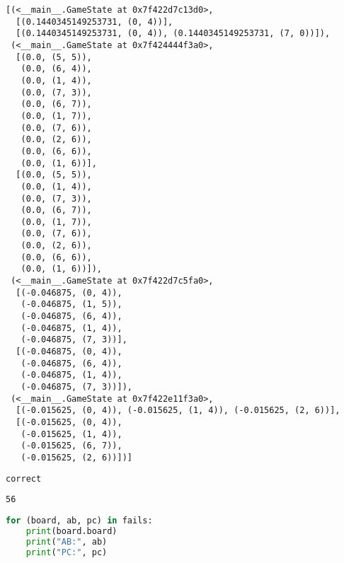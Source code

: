\begin{lstlisting}
[(<__main__.GameState at 0x7f422d7c13d0>,
  [(0.1440345149253731, (0, 4))],
  [(0.1440345149253731, (0, 4)), (0.1440345149253731, (7, 0))]),
 (<__main__.GameState at 0x7f424444f3a0>,
  [(0.0, (5, 5)),
   (0.0, (6, 4)),
   (0.0, (1, 4)),
   (0.0, (7, 3)),
   (0.0, (6, 7)),
   (0.0, (1, 7)),
   (0.0, (7, 6)),
   (0.0, (2, 6)),
   (0.0, (6, 6)),
   (0.0, (1, 6))],
  [(0.0, (5, 5)),
   (0.0, (1, 4)),
   (0.0, (7, 3)),
   (0.0, (6, 7)),
   (0.0, (1, 7)),
   (0.0, (7, 6)),
   (0.0, (2, 6)),
   (0.0, (6, 6)),
   (0.0, (1, 6))]),
 (<__main__.GameState at 0x7f422d7c5fa0>,
  [(-0.046875, (0, 4)),
   (-0.046875, (1, 5)),
   (-0.046875, (6, 4)),
   (-0.046875, (1, 4)),
   (-0.046875, (7, 3))],
  [(-0.046875, (0, 4)),
   (-0.046875, (6, 4)),
   (-0.046875, (1, 4)),
   (-0.046875, (7, 3))]),
 (<__main__.GameState at 0x7f422e11f3a0>,
  [(-0.015625, (0, 4)), (-0.015625, (1, 4)), (-0.015625, (2, 6))],
  [(-0.015625, (0, 4)),
   (-0.015625, (1, 4)),
   (-0.015625, (6, 7)),
   (-0.015625, (2, 6))])]
\end{lstlisting}

\begin{lstlisting}[language=Python]
correct
\end{lstlisting}

\begin{lstlisting}
56
\end{lstlisting}

\begin{lstlisting}[language=Python]
for (board, ab, pc) in fails:
    print(board.board)
    print("AB:", ab)
    print("PC:", pc)
\end{lstlisting}

